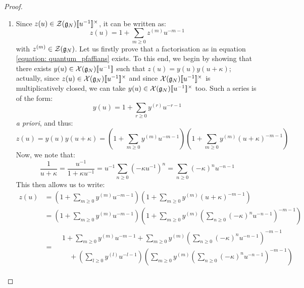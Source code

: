                 \begin{proof}
                    \begin{enumerate}
                        \item Since $z(u) \in \calZ(\g_N)[\![u^{-1}]\!]^{\x}$, it can be written as:
                            $$z(u) = 1 + \sum_{m \geq 0} z^{(m)} u^{-m - 1}$$
                        with $z^{(m)} \in \calZ(\g_N)$. Let us firstly prove that a factorisation as in equation \eqref{equation: quantum_pfaffians} exists. To this end, we begin by showing that there exists $y(u) \in \calX(\g_N)[\![u^{-1}]\!]$ such that $z(u) = y(u) y(u + \kappa)$; actually, since $z(u) \in \calX(\g_N)[\![u^{-1}]\!]^{\x}$ and since $\calX(\g_N)[\![u^{-1}]\!]^{\x}$ is multiplicatively closed, we can take $y(u) \in \calX(\g_N)[\![u^{-1}]\!]^{\x}$ too. Such a series is of the form:
                            $$y(u) = 1 + \sum_{r \geq 0} y^{(r)} u^{-r - 1}$$
                        \textit{a priori}, and thus:
                            $$z(u) = y(u) y(u + \kappa) = \left( 1 + \sum_{m \geq 0} y^{(m)} u^{-m - 1} \right) \left( 1 + \sum_{m \geq 0} y^{(m)} (u + \kappa)^{-m - 1} \right)$$
                        Now, we note that:
                            $$\frac{1}{u + \kappa} = \frac{u^{-1}}{1 + \kappa u^{-1}} = u^{-1} \sum_{n \geq 0} (-\kappa u^{-1})^n = \sum_{n \geq 0} (-\kappa)^n u^{-n - 1}$$
                        This then allows us to write:
                            $$
                                \begin{aligned}
                                    z(u) & = \left( 1 + \sum_{m \geq 0} y^{(m)} u^{-m - 1} \right) \left( 1 + \sum_{m \geq 0} y^{(m)} (u + \kappa)^{-m - 1} \right)
                                    \\
                                    & = \left( 1 + \sum_{m \geq 0} y^{(m)} u^{-m - 1} \right) \left( 1 + \sum_{m \geq 0} y^{(m)} \left( \sum_{n \geq 0} (-\kappa)^n u^{-n - 1} \right)^{-m - 1} \right)
                                    \\
                                    & =
                                    \begin{aligned}
                                        & 1 + \sum_{m \geq 0} y^{(m)} u^{-m - 1} + \sum_{m \geq 0} y^{(m)} \left( \sum_{n \geq 0} (-\kappa)^n u^{-n - 1} \right)^{-m - 1}
                                        \\
                                        & \quad + \left( \sum_{l \geq 0} y^{(l)} u^{-l - 1} \right)\left( \sum_{m \geq 0} y^{(m)} \left( \sum_{n \geq 0} (-\kappa)^n u^{-n - 1} \right)^{-m - 1} \right)

\end{aligned}
\end{aligned}$$
\end{enumerate}
\end{proof}
